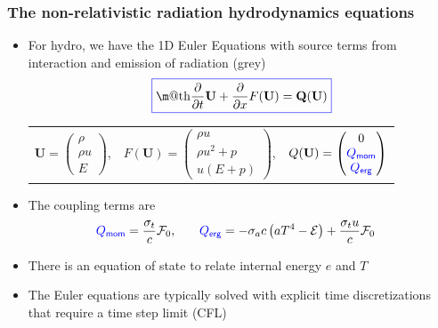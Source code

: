 \documentclass[xcolor=dvipsnames,fontsize=8pt]{beamer}
\makeatletter
\newcommand*{\boxedcolor}{blue}
\newcommand{\fn}[1]{\left( #1 \right)}
\newcommand{\BU}[0]{\ensuremath{\mathbf{U}}}
\newcommand{\E}{\mathcal{E}}
\newcommand{\F}{\mathcal{F}}
\renewcommand{\boxed}[1]{\textcolor{\boxedcolor}{%
  \fbox{\normalcolor\m@th$\displaystyle#1$}}}
\newcommand{\colb}[1]{{\color{blue} #1}}
\newlength{\wideitemsep}
\let\olditem\item
\renewcommand{\item}{\setlength{\itemsep}{\wideitemsep}\olditem}
\newcommand{\pderiv}[2]{\frac{\partial #1}{\partial #2}}
\makeatother
\begin{document}
\begin{frame}
    \frametitle{The non-relativistic radiation hydrodynamics equations}
    \begin{itemize}
        \item For hydro, we have the 1D Euler Equations with source terms from interaction and emission of \colb{radiation} (grey)
            \begin{equation}
                \boxed{
                    \pderiv{ }{t}\BU + \pderiv{ }{x}F(\BU) = \mathbf{Q(\BU)}}
            \end{equation}
            \begin{tabular}{ccc}
                $\BU = \begin{pmatrix} \rho \\ \rho u \\ E \end{pmatrix}$, 
                & $F(\BU) = \begin{pmatrix} \rho u \\ \rho u^2 + p \\ u\fn{E + p}
                \end{pmatrix}$, 
                & $Q(\BU) = \begin{pmatrix} 0 \\ \colb{Q_{\textsf{mom}}} \\
                    \colb{Q_{\textsf{erg}}}
                \end{pmatrix}$
            \end{tabular}
        \item The coupling terms are
            \begin{align*}
                \colb{Q_{\textsf{mom}}} = \frac{\sigma_t}{c} \F_0 , \quad & \quad
                \colb{Q_{\textsf{\textsf{erg}}}}=-\sigma_a
                    c \left( aT^4 - \E \right) + \frac{\sigma_t u}{c} \F_0
            \end{align*}
        \item There is an equation of state to relate internal energy $e$ and $T$
        \item The Euler equations are typically solved with explicit time discretizations that require a \colb{time step limit} (CFL)
    \end{itemize}
\end{frame}
\end{document}
